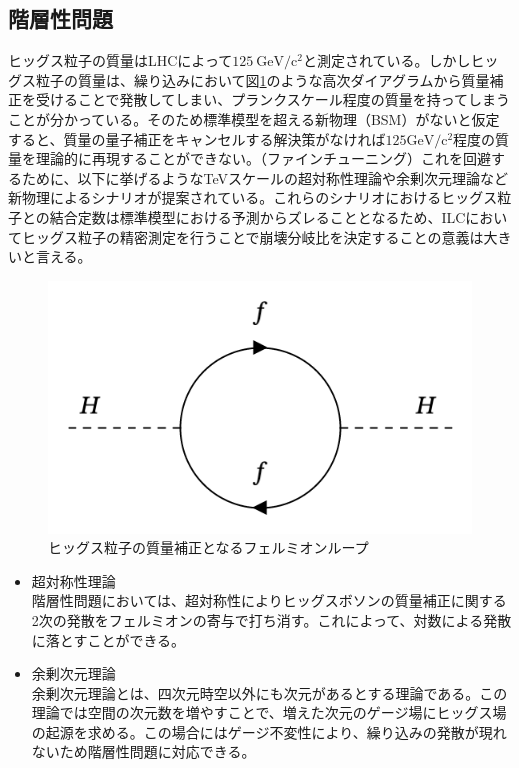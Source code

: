 \subsection{階層性問題}
ヒッグス粒子の質量はLHCによって$125\ \mathrm{GeV/c^2}$と測定されている。しかしヒッグス粒子の質量は、繰り込みにおいて図\ref{hierarchy}のような高次ダイアグラムから質量補正を受けることで発散してしまい、プランクスケール程度の質量を持ってしまうことが分かっている。そのため標準模型を超える新物理（BSM）がないと仮定すると、質量の量子補正をキャンセルする解決策がなければ$125\mathrm{GeV/c^2}$程度の質量を理論的に再現することができない。（ファインチューニング）これを回避するために、以下に挙げるようなTeVスケールの超対称性理論や余剰次元理論など新物理によるシナリオが提案されている。これらのシナリオにおけるヒッグス粒子との結合定数は標準模型における予測からズレることとなるため、ILCにおいてヒッグス粒子の精密測定を行うことで崩壊分岐比を決定することの意義は大きいと言える。
\begin{figure}[h]
	\begin{center}
 \includegraphics[keepaspectratio, scale=0.3]
 	{Figure/Introduction/feynman.png}
 		\caption{ヒッグス粒子の質量補正となるフェルミオンループ}
 		\label{hierarchy}
	\end{center}
\end{figure}
\begin{itemize}
\item{超対称性理論}\\
階層性問題においては、超対称性によりヒッグスボソンの質量補正に関する2次の発散をフェルミオンの寄与で打ち消す。これによって、対数による発散に落とすことができる。
\item{余剰次元理論}\\
余剰次元理論とは、四次元時空以外にも次元があるとする理論である。この理論では空間の次元数を増やすことで、増えた次元のゲージ場にヒッグス場の起源を求める。この場合にはゲージ不変性により、繰り込みの発散が現れないため階層性問題に対応できる。
\end{itemize}

